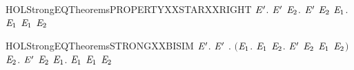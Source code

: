 \newcommand{\HOLStrongEQTheoremsPROPERTYXXSTARXXLEFT}{\UseVerbatim{HOLStrongEQTheoremsPROPERTYXXSTARXXLEFT}}
\begin{SaveVerbatim}{HOLStrongEQTheoremsPROPERTYXXSTARXXRIGHT}
\HOLTokenTurnstile{} \HOLSymConst{\HOLTokenForall{}} \ensuremath{\HOLBoundVar{E}\sp{\prime}}.
         \ensuremath{\HOLBoundVar{E}\sp{\prime}} \HOLSymConst{\HOLTokenImp{}}
       \HOLSymConst{\HOLTokenForall{}} \ensuremath{\HOLBoundVar{E}\sb{\mathrm{2}}}. \ensuremath{\HOLBoundVar{E}\sp{\prime}} \HOLTokenTransBegin{}\HOLTokenTransEnd \ensuremath{\HOLBoundVar{E}\sb{\mathrm{2}}} \HOLSymConst{\HOLTokenImp{}} \HOLSymConst{\HOLTokenExists{}}\ensuremath{\HOLBoundVar{E}\sb{\mathrm{1}}}.  \HOLTokenTransBegin{}\HOLTokenTransEnd \ensuremath{\HOLBoundVar{E}\sb{\mathrm{1}}} \HOLSymConst{\HOLTokenConj{}}  \ensuremath{\HOLBoundVar{E}\sb{\mathrm{1}}} \ensuremath{\HOLBoundVar{E}\sb{\mathrm{2}}}
\end{SaveVerbatim}
\newcommand{\HOLStrongEQTheoremsPROPERTYXXSTARXXRIGHT}{\UseVerbatim{HOLStrongEQTheoremsPROPERTYXXSTARXXRIGHT}}
\begin{SaveVerbatim}{HOLStrongEQTheoremsSTRONGXXBISIM}
\HOLTokenTurnstile{}   \HOLSymConst{\HOLTokenEquiv{}}
   \HOLSymConst{\HOLTokenForall{}} \ensuremath{\HOLBoundVar{E}\sp{\prime}}.
         \ensuremath{\HOLBoundVar{E}\sp{\prime}} \HOLSymConst{\HOLTokenImp{}}
       \HOLSymConst{\HOLTokenForall{}}.
           \ensuremath{(}\HOLSymConst{\HOLTokenForall{}}\ensuremath{\HOLBoundVar{E}\sb{\mathrm{1}}}.  \HOLTokenTransBegin{}\HOLTokenTransEnd \ensuremath{\HOLBoundVar{E}\sb{\mathrm{1}}} \HOLSymConst{\HOLTokenImp{}} \HOLSymConst{\HOLTokenExists{}}\ensuremath{\HOLBoundVar{E}\sb{\mathrm{2}}}. \ensuremath{\HOLBoundVar{E}\sp{\prime}} \HOLTokenTransBegin{}\HOLTokenTransEnd \ensuremath{\HOLBoundVar{E}\sb{\mathrm{2}}} \HOLSymConst{\HOLTokenConj{}}  \ensuremath{\HOLBoundVar{E}\sb{\mathrm{1}}} \ensuremath{\HOLBoundVar{E}\sb{\mathrm{2}}}\ensuremath{)} \HOLSymConst{\HOLTokenConj{}}
           \HOLSymConst{\HOLTokenForall{}}\ensuremath{\HOLBoundVar{E}\sb{\mathrm{2}}}. \ensuremath{\HOLBoundVar{E}\sp{\prime}} \HOLTokenTransBegin{}\HOLTokenTransEnd \ensuremath{\HOLBoundVar{E}\sb{\mathrm{2}}} \HOLSymConst{\HOLTokenImp{}} \HOLSymConst{\HOLTokenExists{}}\ensuremath{\HOLBoundVar{E}\sb{\mathrm{1}}}.  \HOLTokenTransBegin{}\HOLTokenTransEnd \ensuremath{\HOLBoundVar{E}\sb{\mathrm{1}}} \HOLSymConst{\HOLTokenConj{}}  \ensuremath{\HOLBoundVar{E}\sb{\mathrm{1}}} \ensuremath{\HOLBoundVar{E}\sb{\mathrm{2}}}
\end{SaveVerbatim}

